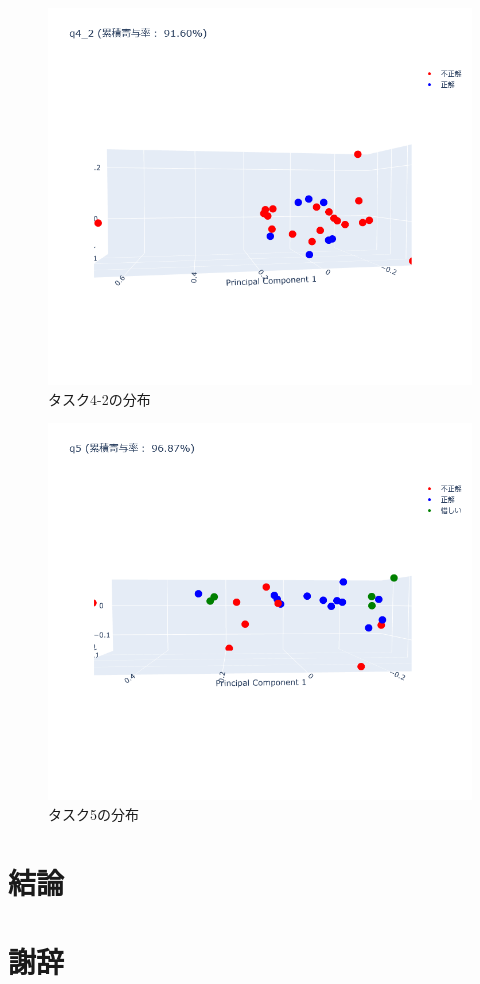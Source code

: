 \documentclass[paper=a4paper,fontsize=10pt]{jlreq}
\begin{document}
    \begin{figure}[htbp]
      \centering
      \includegraphics[width=0.8\linewidth]{3dplot_q4_2.png}
      \caption{タスク4-2の分布}
    \end{figure}
    \FloatBarrier
    \begin{figure}[htbp]
      \centering
      \includegraphics[width=0.8\linewidth]{3dplot_q5.png}
      \caption{タスク5の分布}
    \end{figure}
    \FloatBarrier

\clearpage    

\part{結論}


\part{謝辞}
\end{document}
